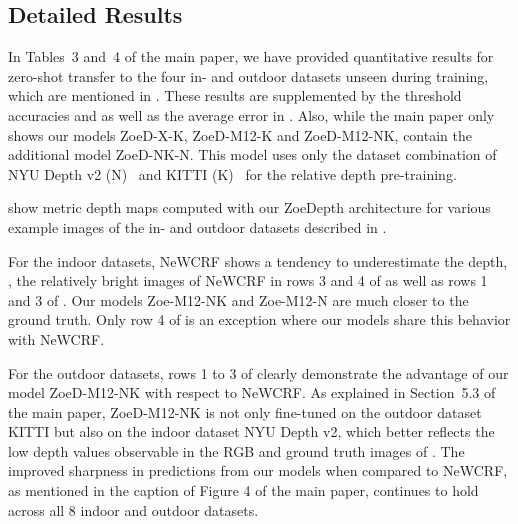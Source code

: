 \documentclass[10pt,twocolumn,letterpaper]{article}
\begin{document}
\subsection{Detailed Results} 
\label{sec:additional-results}
In Tables~3 and~4 of the main paper, we have provided quantitative results for zero-shot transfer to the four in- and outdoor datasets unseen during training, which are mentioned in . These results are supplemented by the threshold accuracies  and  as well as the average  error in . Also, while the main paper only shows our models ZoeD-X-K, ZoeD-M12-K and ZoeD-M12-NK,  contain the additional model ZoeD-NK-N. This model uses only the dataset combination of NYU Depth v2 (N)~\cite{Silberman2012} and KITTI (K)~\cite{Menze_2015_CVPR} for the relative depth pre-training.

 show metric depth maps computed with our ZoeDepth architecture for various example images of the in- and outdoor datasets described in .

For the indoor datasets, NeWCRF shows a tendency to underestimate the depth, \eg, the relatively bright images of NeWCRF in rows 3 and 4 of  as well as rows 1 and 3 of . Our models Zoe-M12-NK and Zoe-M12-N are much closer to the ground truth. Only row 4 of  is an exception where our models share this behavior with NeWCRF. 

For the outdoor datasets, rows 1 to 3 of  clearly demonstrate the advantage of our model ZoeD-M12-NK with respect to NeWCRF. As explained in Section~5.3 of the main paper, ZoeD-M12-NK is not only fine-tuned on the outdoor dataset KITTI but also on the indoor dataset NYU Depth v2, which better reflects the low depth values observable in the RGB and ground truth images of . The improved sharpness in predictions from our models when compared to NeWCRF, as mentioned in the caption of Figure 4 of the main paper, continues to hold across all 8 indoor and outdoor datasets. 
\end{document}
